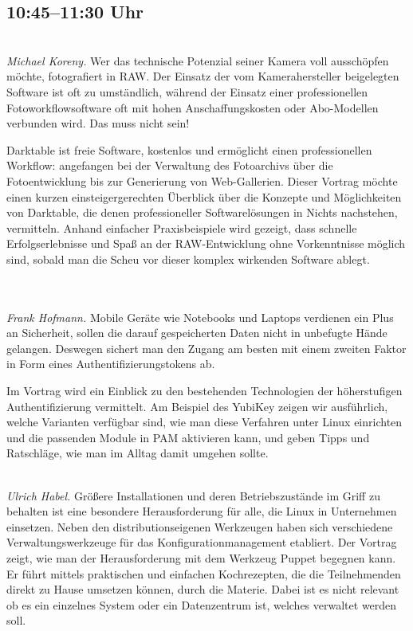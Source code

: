 \documentclass[10pt,a4paper,ngerman]{scrartcl}
\let\origdescription\description
\renewenvironment{description}{
  \setlength{\leftmargini}{0em}
  \origdescription
  \setlength{\itemindent}{0em}
  \setlength{\itemsep}{1.2em}
  \setlength{\labelsep}{\textwidth}
}
{\endlist}
\newcommand{\vorschub}{\mbox{}\\[-0.5em]}
\begin{document}
\begin{multicols}{2}

\section{10:45--11:30 Uhr}

\begin{description}
\item[Fotobearbeitung und -verwaltung mit Darktable]\vorschub
\textsl{Michael Koreny.}
Wer das technische Potenzial seiner Kamera voll ausschöpfen möchte, fotografiert in RAW. Der Einsatz der vom Kamerahersteller beigelegten Software ist oft zu umständlich, während der Einsatz einer professionellen Fotoworkflowsoftware oft mit hohen Anschaffungskosten oder Abo-Modellen verbunden wird. Das muss nicht sein!

Darktable ist freie Software, kostenlos und ermöglicht einen professionellen Workflow: angefangen bei der Verwaltung des Fotoarchivs über die Fotoentwicklung bis zur Generierung von Web-Gallerien. Dieser Vortrag möchte einen kurzen einsteigergerechten Überblick über die Konzepte und Möglichkeiten von Darktable, die denen professioneller Softwarelösungen in Nichts nachstehen, vermitteln. Anhand einfacher Praxisbeispiele wird gezeigt, dass schnelle Erfolgserlebnisse und Spaß an der RAW-Entwicklung ohne Vorkenntnisse möglich sind, sobald man die Scheu vor dieser komplex wirkenden Software ablegt.



\item[{\parbox[t]{\linewidth}{YubiKey. Praktikable Zwei-Faktor-Authentifizierung für Linux und mobile Geräte}}]\vorschub\\
\textsl{Frank Hofmann.}
Mobile Geräte wie Notebooks und Laptops verdienen ein Plus an Sicherheit, sollen die darauf gespeicherten Daten nicht in unbefugte Hände gelangen. Deswegen sichert man den Zugang am besten mit einem zweiten Faktor in Form eines Authentifizierungstokens ab.

Im Vortrag wird ein Einblick zu den bestehenden Technologien der höherstufigen Authentifizierung vermittelt. Am Beispiel des YubiKey zeigen wir ausführlich, welche Varianten verfügbar sind, wie man diese Verfahren unter Linux einrichten und die passenden Module in PAM aktivieren kann, und geben Tipps und Ratschläge, wie man im Alltag damit umgehen sollte.




\item[Zentrale Konfigurationsverwaltung mit Puppet]\vorschub
\textsl{Ulrich Habel.} Größere Installationen und deren Betriebszustände im Griff zu behalten ist eine besondere Herausforderung für alle, die Linux in Unternehmen einsetzen. Neben den distributionseigenen Werkzeugen haben sich verschiedene Verwaltungswerkzeuge für das Konfigurationmanagement etabliert. Der Vortrag zeigt, wie man der Herausforderung mit dem Werkzeug Puppet begegnen kann. Er führt mittels praktischen und einfachen Kochrezepten, die die Teilnehmenden direkt zu Hause umsetzen können, durch die Materie. Dabei ist es nicht relevant ob es ein einzelnes System oder ein Datenzentrum ist, welches verwaltet werden soll.


\end{description}
\end{multicols}
\end{document}
